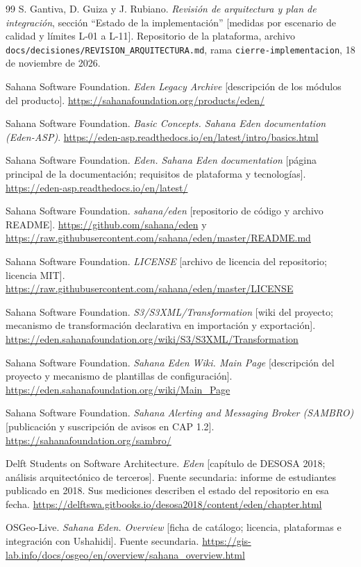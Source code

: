 \documentclass[11pt,letterpaper]{article}
\begin{document}
\begin{thebibliography}{99}
S. Gantiva, D. Guiza y J. Rubiano. \textit{Revisión de arquitectura y plan de integración},
sección \enquote{Estado de la implementación} [medidas por escenario de calidad y límites L-01 a
L-11]. Repositorio de la plataforma, archivo
\texttt{docs/decisiones/REVISION\_ARQUITECTURA.md}, rama \texttt{cierre-implementacion}, 18 de
noviembre de 2026.

Sahana Software Foundation. \textit{Eden Legacy Archive} [descripción de los módulos del producto].
\url{https://sahanafoundation.org/products/eden/}

Sahana Software Foundation. \textit{Basic Concepts. Sahana Eden documentation (Eden-ASP)}.
\url{https://eden-asp.readthedocs.io/en/latest/intro/basics.html}

Sahana Software Foundation. \textit{Eden. Sahana Eden documentation} [página principal de la
documentación; requisitos de plataforma y tecnologías].
\url{https://eden-asp.readthedocs.io/en/latest/}

Sahana Software Foundation. \textit{sahana/eden} [repositorio de código y archivo README].
\url{https://github.com/sahana/eden} y
\url{https://raw.githubusercontent.com/sahana/eden/master/README.md}

Sahana Software Foundation. \textit{LICENSE} [archivo de licencia del repositorio; licencia MIT].
\url{https://raw.githubusercontent.com/sahana/eden/master/LICENSE}

Sahana Software Foundation. \textit{S3/S3XML/Transformation} [wiki del proyecto; mecanismo de
transformación declarativa en importación y exportación].
\url{https://eden.sahanafoundation.org/wiki/S3/S3XML/Transformation}

Sahana Software Foundation. \textit{Sahana Eden Wiki. Main Page} [descripción del proyecto y
mecanismo de plantillas de configuración].
\url{https://eden.sahanafoundation.org/wiki/Main_Page}

Sahana Software Foundation. \textit{Sahana Alerting and Messaging Broker (SAMBRO)} [publicación y
suscripción de avisos en CAP 1.2].
\url{https://sahanafoundation.org/sambro/}

Delft Students on Software Architecture. \textit{Eden} [capítulo de DESOSA 2018; análisis
arquitectónico de terceros]. Fuente secundaria: informe de estudiantes publicado en 2018. Sus
mediciones describen el estado del repositorio en esa fecha.
\url{https://delftswa.gitbooks.io/desosa2018/content/eden/chapter.html}

OSGeo-Live. \textit{Sahana Eden. Overview} [ficha de catálogo; licencia, plataformas e integración
con Ushahidi]. Fuente secundaria.
\url{https://gis-lab.info/docs/osgeo/en/overview/sahana_overview.html}

\end{thebibliography}
\endgroup
\end{document}
